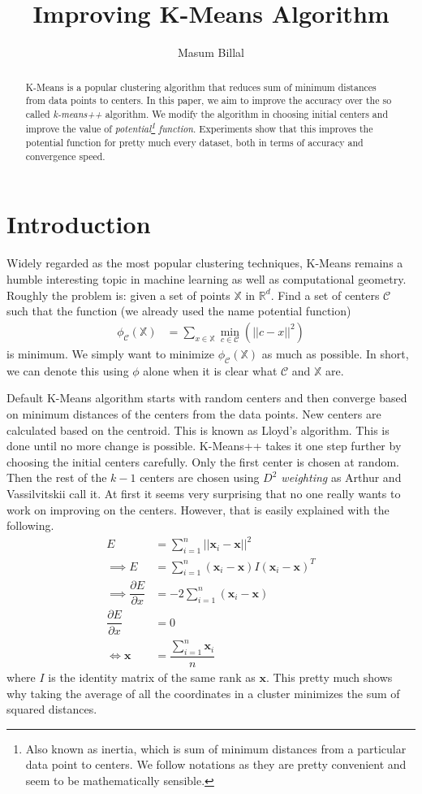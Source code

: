 \documentclass[10pt, leqno]{article}
\author{Masum Billal}
\title{\bfseries Improving K-Means Algorithm}
\newcommand{\x}{\mathbf{x}}
\begin{document}
	\maketitle
		\begin{abstract}
			K-Means is a popular clustering algorithm that reduces sum of minimum distances from data points to centers. In this paper, we aim to improve the accuracy over the so called \textit{k-means++} algorithm. We modify the algorithm in choosing initial centers and improve the value of \textit{potential\footnote{Also known as inertia, which is sum of minimum distances from a particular data point to centers. We follow \cite{kmeans++} notations as they are pretty convenient and seem to be mathematically sensible.} function}. Experiments show that this improves the potential function for pretty much every dataset, both in terms of accuracy and convergence speed.
		\end{abstract}
	\section{Introduction}
	Widely regarded as the most popular clustering techniques, K-Means remains a humble interesting topic in machine learning as well as computational geometry. Roughly the problem is: given a set of points $\mathbb{X}$ in $\mathbb{R}^d$. Find a set of centers $\mathcal{C}$ such that the function (we already used the name potential function)
		\begin{align*}
			\phi_{\mathcal{C}}(\mathbb{X}) & = \sum_{x\in\mathbb{X}}\min_{c\in\mathcal{C}}(||c-x||^2)
		\end{align*}
	is minimum. We simply want to minimize $\phi_{\mathcal{C}}(\mathbb{X})$ as much as possible. In short, we can denote this using $\phi$ alone when it is clear what $\mathcal{C}$ and $\mathbb{X}$ are.
	
	Default K-Means algorithm starts with random centers and then converge based on minimum distances of the centers from the data points. New centers are calculated based on the centroid. This is known as Lloyd's algorithm. This is done until no more change is possible. K-Means++ takes it one step further by choosing the initial centers carefully. Only the first center is chosen at random. Then the rest of the $k-1$ centers are chosen using \textit{$D^2$ weighting} as Arthur and Vassilvitskii call it\cite{kmeans++}. At first it seems very surprising that no one really wants to work on improving on the centers. However, that is easily explained with the following.
		\begin{align*}
			E & = \sum_{i=1}^n||\x_i-\x||^2\\
			\implies E & = \sum_{i=1}^n(\x_i-\x)I(\x_i-\x)^{T}\\
			\implies \dfrac{\partial{E}}{\partial{x}} & = -2\sum_{i=1}^n(\x_i-\x)\\
			\dfrac{\partial{E}}{\partial{x}} & = 0\\
			\iff \x & = \dfrac{\sum_{i=1}^n\x_i}{n}
		\end{align*}
	where $I$ is the identity matrix of the same rank as $\x$. This pretty much shows why taking the average of all the coordinates in a cluster minimizes the sum of squared distances.
	
\end{document}
